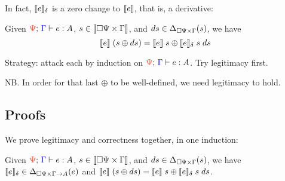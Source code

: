 \documentclass{rntz}
\begin{document}
In fact, $\llbracket{e}\rrbracket_\delta$ is a zero change to $\llbracket{e}\rrbracket$, that is, a derivative:

\begin{theorem}[Correctness]
  Given $\J{\GP}{\GG}{e}{A}$, $s \in {\llbracket{\square{\Psi} \times\Gamma}\rrbracket}$,
  and $ds \in \Delta_{\square{\Psi} \times \Gamma}({s})$, we have
  \begin{equation*}
    \llbracket{e}\rrbracket\; (s \oplus ds)
    =
    \llbracket{e}\rrbracket\; s \oplus \llbracket{e}\rrbracket_\delta \; s \; ds
  \end{equation*}


\end{theorem}

Strategy: attack each by induction on $\J{\GP}{\GG}{e}{A}$. Try legitimacy
first.

NB. In order for that last $\oplus$ to be well-defined, we need legitimacy to
hold.


\subsection{Proofs}

We prove legitimacy and correctness together, in one induction:

\begin{lemma}
  Given $\J{\GP}{\GG}{e}{A}$, $s \in {\llbracket{\square{\Psi} \times\Gamma}\rrbracket}$, and $ds \in
  \Delta_{\square{\Psi} \times \Gamma}({s})$, we have $\llbracket{e}\rrbracket_\delta \in \Delta_{\square{\Psi} \times
    \Gamma \to A}({e})$ and $\llbracket{e}\rrbracket \;(s \oplus ds) = \llbracket{e}\rrbracket\;s \oplus
  \llbracket{e}\rrbracket_\delta\;s\;ds$.
\end{lemma}
\end{document}
